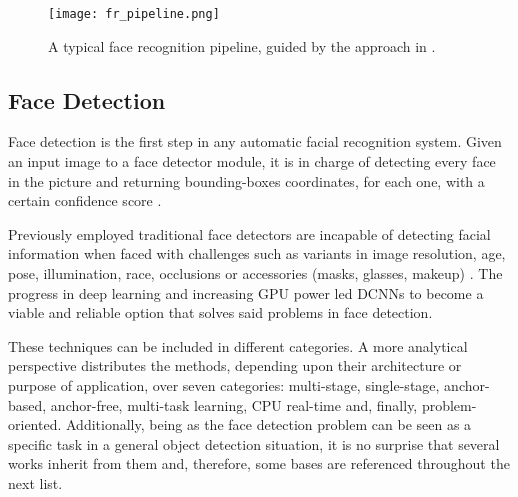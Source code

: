 \documentclass[class=report, crop=false, a4paper, 12pt]{standalone}
\begin{document}
\begin{figure}[!t]
    \texttt{[image: fr\_pipeline.png]}
    \caption[Pipeline]{A typical face recognition pipeline, guided by the approach in \autocite{wangDeepFaceRecognition2021}.}
    \label{fig:fr pipeline}
\end{figure}

\subsection{Face Detection}
\par Face detection is the first step in any automatic facial recognition system. Given an input image to a face detector module, it is in charge of detecting every face in the picture and returning bounding-boxes coordinates, for each one, with a certain confidence score \autocite{duElementsEndtoendDeep2022,ranjanDeepLearningUnderstanding2018}.

\par Previously employed traditional face detectors  are incapable of detecting facial information when faced with challenges such as variants in image resolution, age, pose, illumination, race, occlusions or accessories (masks, glasses, makeup) \autocite{duElementsEndtoendDeep2022,ranjanDeepLearningUnderstanding2018}. The progress in deep learning and increasing GPU power led DCNNs to become a viable and reliable option that solves said problems in face detection. 

\par These techniques can be included in different categories. A more analytical perspective \autocite{duElementsEndtoendDeep2022} distributes the methods, depending upon their architecture or purpose of application, over seven categories: multi-stage, single-stage, anchor-based, anchor-free, multi-task learning, CPU real-time and, finally, problem-oriented. Additionally, being as the face detection problem can be seen as a specific task in a general object detection situation, it is no surprise that several works inherit from them and, therefore, some bases are referenced throughout the next list.
\end{document}
